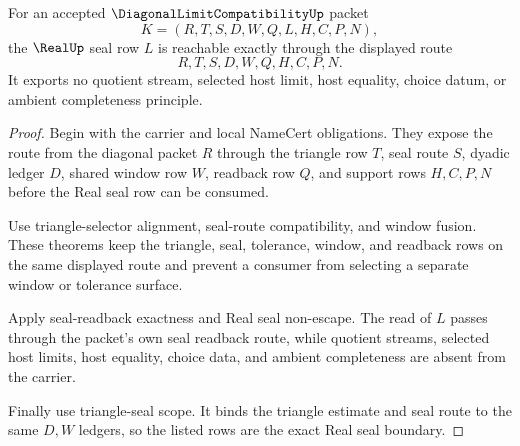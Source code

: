 \begin{theorem}
\label{thm:diagonal-limit-compatibility-real-seal-exactness}
For an accepted $\DiagonalLimitCompatibilityUp$ packet
$$
K=(R,T,S,D,W,Q,L,H,C,P,N),
$$
the $\RealUp$ seal row $L$ is reachable exactly through the displayed route
$$
R,T,S,D,W,Q,H,C,P,N.
$$
It exports no quotient stream, selected host limit, host equality, choice datum, or ambient completeness principle.
\end{theorem}
\begin{proof}
Begin with the carrier and local NameCert obligations. They expose the route from the diagonal packet $R$ through the triangle row $T$, seal route $S$, dyadic ledger $D$, shared window row $W$, readback row $Q$, and support rows $H,C,P,N$ before the Real seal row can be consumed.

Use triangle-selector alignment, seal-route compatibility, and window fusion. These theorems keep the triangle, seal, tolerance, window, and readback rows on the same displayed route and prevent a consumer from selecting a separate window or tolerance surface.

Apply seal-readback exactness and Real seal non-escape. The read of $L$ passes through the packet's own seal readback route, while quotient streams, selected host limits, host equality, choice data, and ambient completeness are absent from the carrier.

Finally use triangle-seal scope. It binds the triangle estimate and seal route to the same $D,W$ ledgers, so the listed rows are the exact Real seal boundary.
\end{proof}


